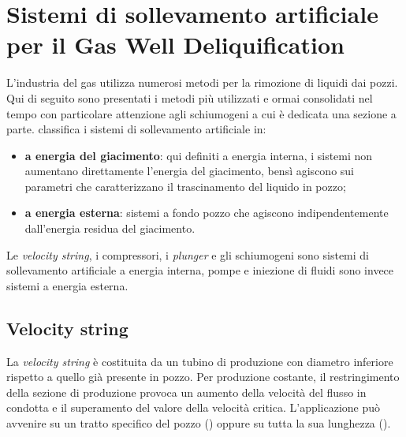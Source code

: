 \section[Sollevamento artificiale per GDW]{Sistemi di sollevamento artificiale per il Gas Well Deliquification}
L'industria del gas utilizza numerosi metodi per la rimozione di liquidi dai pozzi. Qui di seguito sono presentati i metodi più utilizzati e ormai consolidati nel tempo con particolare attenzione agli schiumogeni a cui è dedicata una sezione a parte. \textcite{oyewole2008artificial} classifica i sistemi di sollevamento artificiale in:
\begin{itemize}
    \item \textbf{a energia del giacimento}: qui definiti  a energia interna, i sistemi non aumentano direttamente l'energia del giacimento, bensì agiscono sui parametri che caratterizzano il trascinamento del liquido in pozzo;
    \item \textbf{a energia esterna}: sistemi a fondo pozzo che agiscono indipendentemente dall'energia residua del giacimento.
\end{itemize}
Le \textit{velocity string}, i compressori, i \textit{plunger} e gli schiumogeni sono sistemi di sollevamento artificiale a energia interna, pompe e iniezione di fluidi sono invece sistemi a energia esterna.

\subsection{Velocity string}
La \textit{velocity string} è costituita da un tubino di produzione con diametro inferiore rispetto a quello già presente in pozzo. Per produzione costante, il restringimento della sezione di produzione provoca un aumento della velocità del flusso in condotta e il superamento del valore della velocità critica. L'applicazione può avvenire su un tratto specifico del pozzo () oppure su tutta la sua lunghezza ().

